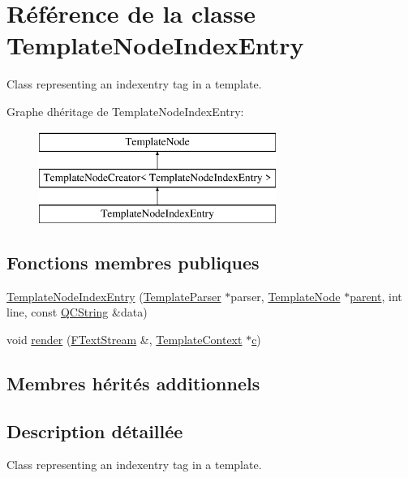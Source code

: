 \hypertarget{class_template_node_index_entry}{}\section{Référence de la classe Template\+Node\+Index\+Entry}
\label{class_template_node_index_entry}


Class representing an \textquotesingle{}indexentry\textquotesingle{} tag in a template.  


Graphe d\textquotesingle{}héritage de Template\+Node\+Index\+Entry\+:\begin{figure}[H]
\begin{center}
\leavevmode
\includegraphics[height=3.000000cm]{class_template_node_index_entry}
\end{center}
\end{figure}
\subsection*{Fonctions membres publiques}
\begin{DoxyCompactItemize}
\item 
\hyperlink{class_template_node_index_entry_a39d627f91dbb680c38f9215ae7a2c9c6}{Template\+Node\+Index\+Entry} (\hyperlink{class_template_parser}{Template\+Parser} $\ast$parser, \hyperlink{class_template_node}{Template\+Node} $\ast$\hyperlink{class_template_node_a69a306ef84e62af9fe57bf9aacc94536}{parent}, int line, const \hyperlink{class_q_c_string}{Q\+C\+String} \&data)
\item 
void \hyperlink{class_template_node_index_entry_acc7c6d66ec1082be2906923dd46dbafe}{render} (\hyperlink{class_f_text_stream}{F\+Text\+Stream} \&, \hyperlink{class_template_context}{Template\+Context} $\ast$\hyperlink{060__command__switch_8tcl_ab14f56bc3bd7680490ece4ad7815465f}{c})
\end{DoxyCompactItemize}
\subsection*{Membres hérités additionnels}


\subsection{Description détaillée}
Class representing an \textquotesingle{}indexentry\textquotesingle{} tag in a template. 

